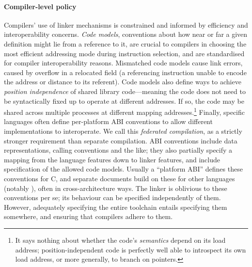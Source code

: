 \paragraph{Compiler-level policy} 
Compilers' use of linker mechanisms is constrained and informed
by efficiency and interoperability concerns. 
\emph{Code models}, conventions about 
how near or far a given definition might lie from a reference to it, 
are crucial to compilers in choosing the most efficient addressing mode
during instruction selection, and are standardised for compiler interoperability reasons.
Mismatched code models cause link errors, caused by overflow in a relocated field 
(a referencing instruction unable to encode the address or distance to its referent).
Code models also define ways to achieve \emph{position independence} of shared library
code---meaning the code does not need to be syntactically
fixed up to operate at different addresses. If so, 
the code may be shared across multiple processes at different mapping addresses.\footnote{It says nothing about
whether the code's \emph{semantics} depend on its load address; 
position-independent code is perfectly well able to 
introspect its own load address, or more generally, to branch on pointers.}
Finally, specific languages often define per-platform ABI conventions to
allow different implementations to interoperate.
We call this \emph{federated compilation}, as a strictly stronger 
requirement than separate compilation.
ABI conventions include data representations, calling conventions and the like; they also 
partially specify a mapping from the language features down to linker features,
and include specification of the allowed code models.
Usually a ``platform ABI'' defines these conventions for C,
and separate documents build on these for other languages (notably \Cplusplus{}), 
often in cross-architecture ways.
The linker is oblivious to these conventions per se; 
its behaviour can be specified independently of them. 
However, adequately specifying the entire toolchain entails
specifying them somewhere, and ensuring that compilers adhere to them.

